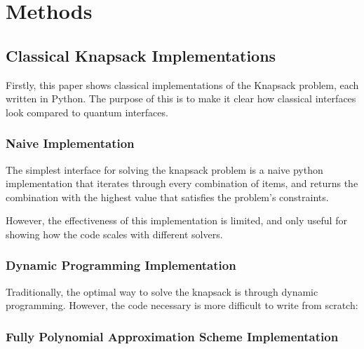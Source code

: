 \documentclass{article}
\begin{document}
\section{Methods}

\subsection{Classical Knapsack Implementations}

Firstly, this paper shows classical implementations of the Knapsack problem, each written in Python.
The purpose of this is to make it clear how classical interfaces look compared to quantum interfaces.

\subsubsection{Naive Implementation}

The simplest interface for solving the knapsack problem is a naive python implementation that iterates through every combination of items, and returns the combination with the highest value that satisfies the problem's constraints.
\lstset{language=Python}

However, the effectiveness of this implementation is limited, and only useful for showing how the code scales with different solvers.

\subsubsection{Dynamic Programming Implementation}

Traditionally, the optimal way to solve the knapsack is through dynamic programming.
However, the code necessary is more difficult to write from scratch:

\lstset{language=Python}


\subsubsection{Fully Polynomial Approximation Scheme Implementation}
\end{document}
